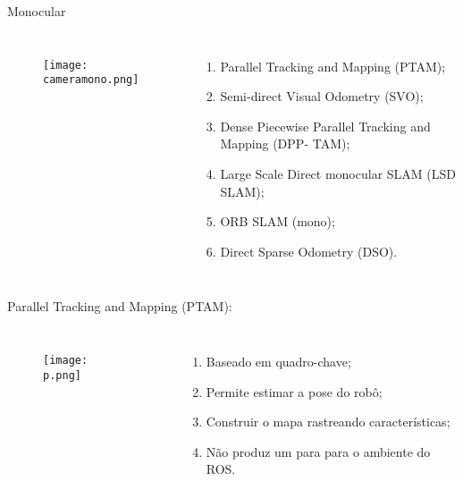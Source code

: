 \begin{frame}[t]{Monocular}
    \transboxout[duration=0.5]
    \begin{columns}
            \begin{figure}
                \texttt{[image: cameramono.png]}
                \caption{\cite{Baslerca30}}
            \end{figure}
            \begin{enumerate}
                \item Parallel Tracking and Mapping (PTAM);
                \item Semi-direct Visual Odometry (SVO);
                \item Dense Piecewise Parallel Tracking and Mapping (DPP-
                        TAM);
                \item Large Scale Direct monocular SLAM (LSD SLAM);
                \item ORB SLAM (mono);
                \item Direct Sparse Odometry (DSO).
            \end{enumerate}
    \end{columns}
\end{frame}
\begin{frame}[c]{Parallel Tracking and Mapping (PTAM):}
    \transboxout[duration=0.5]
    \begin{columns}
            \begin{figure}
            \texttt{[image: p.png]}
            \caption{\cite{webcite}}
            \end{figure}
            \begin{enumerate}
                \item Baseado em quadro-chave;
                \item Permite estimar a pose do robô; 
                \item Construir o mapa rastreando características; 
                \item Não produz um para para o ambiente do ROS.
            \end{enumerate}
    \end{columns}
\end{frame}

